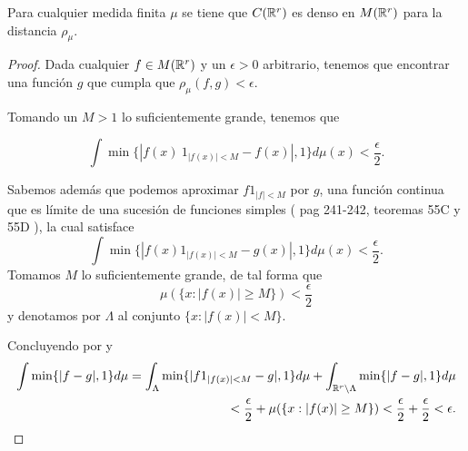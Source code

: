 \begin{lema}\label{lema:A_1_C_es_denso_en_M}
    Para cualquier medida finita $\mu$ se tiene que $C(\mathbb{R}^r)$ es denso en 
    $M(\mathbb{R}^r)$ para la distancia $\rho_\mu$.
\end{lema}
\begin{proof}
    Dada cualquier $f \in M(\mathbb{R}^r)$ y un $\epsilon > 0$ arbitrario, 
    tenemos que encontrar una función $g$ que cumpla que 
    $\rho_{\mu}(f, g) < \epsilon$. 

    Tomando un $M > 1$ lo suficientemente grande, tenemos que 
    
    \begin{equation}
        \int \min \{ |f(x)\ 1_{|f(x)| < M} - f(x)|, 1\} d\mu(x)
        < \frac{\epsilon}{2}. 
    \end{equation}

    Sabemos además que podemos aproximar $f 1_{|f| < M}$ por $g$, una función continua que es límite de una sucesión de
    funciones simples ( pag 241-242,  teoremas 55C y 55D \cite{nla.cat-vn1819421}), 
    la cual satisface 
    \begin{equation}\label{eq:lema3_3_integral}
        \int \min \{ |f(x) 1_{|f(x)| < M} - g(x)|, 1\} d\mu(x) 
        < \frac{\epsilon}{2}. 
    \end{equation}
    Tomamos $M$ lo suficientemente grande, de tal forma que 
    \begin{equation} \label{eq:lema3_3_medida_conjunto}
        \mu(\{ x: |f(x)| \geq M\}) < \frac{\epsilon}{2}
    \end{equation}
    y denotamos por $\Lambda$ al conjunto $\{ x: |f(x)| < M\}.$
    
    Concluyendo por  y 
     \begin{equation}
        \begin{split}
            \int \min \{ |f  - g|, 1\} d\mu 
            = 
            \int_\Lambda \min \{ |f1_{|f(x)| < M}  - g|, 1\} d\mu
            + 
            \int_{\mathbb{R}^r \setminus \Lambda} \min \{ |f  - g|, 1\} d\mu 
            \\
            <
            \frac{\epsilon}{2} 
            + 
            \mu(\{ x: |f(x)| \geq M\}) 
            <
            \frac{\epsilon}{2} 
            + 
            \frac{\epsilon}{2} 
            < \epsilon. 
    \end{split}
    \end{equation}
\end{proof}








